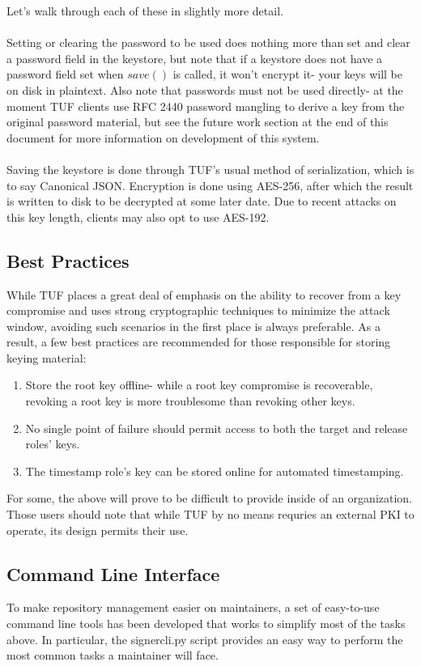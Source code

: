 \documentclass{article}
\begin{document}
Let's walk through each of these in slightly more detail.
\\\\
Setting or clearing the password to be used does nothing more than set and clear
a password field in the keystore, but note that if a keystore does not have a
password field set when $save()$ is called, it won't encrypt it- your keys will
be on disk in plaintext. Also note that passwords must not be used directly- at
the moment TUF clients use RFC 2440 password mangling to derive a key from
the original password material, but see the future work section at the end of
this document for more information on development of this system.
\\\\
Saving the keystore is done through TUF's usual method of serialization, which
is to say Canonical JSON. Encryption is done using AES-256, after which the result
is written to disk to be decrypted at some later date. Due to recent attacks on
this key length, clients may also opt to use AES-192.

\subsection{Best Practices}
While TUF places a great deal of emphasis on the ability to recover from a key 
compromise and uses strong cryptographic techniques to minimize the attack window, 
avoiding such scenarios in the first place is always preferable. As a result, a
few best practices are recommended for those responsible for storing keying
material:

\begin{enumerate}
	\item Store the root key offline- while a root key compromise is recoverable,
		revoking a root key is more troublesome than revoking other keys.
	\item No single point of failure should permit access to both the target
		and release roles' keys.
	\item The timestamp role's key can be stored online for automated timestamping.
\end{enumerate}

For some, the above will prove to be difficult to provide inside of an
organization. Those users should note that while TUF by no means requries an
external PKI to operate, its design permits their use.

\subsection{Command Line Interface}
To make repository management easier on maintainers, a set of easy-to-use command
line tools has been developed that works to simplify most of the tasks above. 
In particular, the signercli.py script provides an easy way to perform the most
common tasks a maintainer will face.
\end{document}
